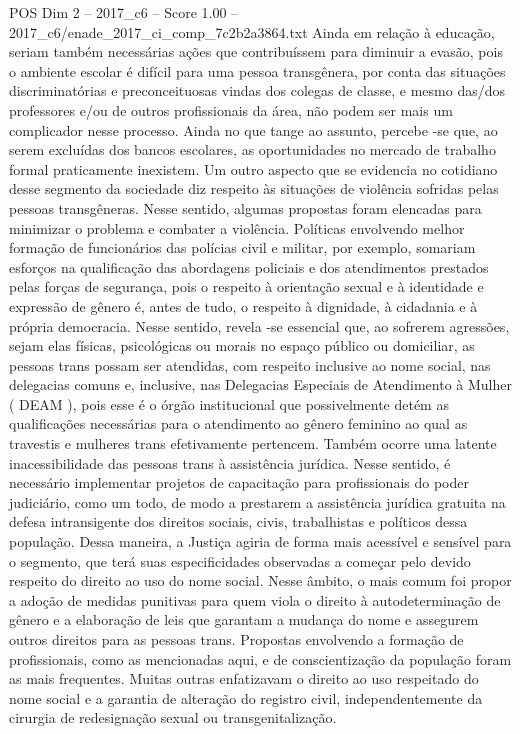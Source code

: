 \begin{textsample}{POS Dim 2 – 2017\_c6 – Score 1.00 – 2017\_c6/enade\_2017\_ci\_comp\_7c2b2a3864.txt}
Ainda em relação à educação, seriam também necessárias ações que contribuíssem para diminuir a evasão, pois o ambiente escolar é difícil para uma pessoa transgênera, por conta das situações discriminatórias e preconceituosas vindas dos colegas de classe, e mesmo das/dos professores e/ou de outros profissionais da área, não podem ser mais um complicador nesse processo.
Ainda no que tange ao assunto, percebe -se que, ao serem excluídas dos bancos escolares, as oportunidades no mercado de trabalho formal praticamente inexistem.
Um outro aspecto que se evidencia no cotidiano desse segmento da sociedade diz respeito às situações de violência sofridas pelas pessoas transgêneras.
Nesse sentido, algumas propostas foram elencadas para minimizar o problema e combater a violência.
Políticas envolvendo melhor formação de funcionários das polícias civil e militar, por exemplo, somariam esforços na qualificação das abordagens policiais e dos atendimentos prestados pelas forças de segurança, pois o respeito à orientação sexual e à identidade e expressão de gênero é, antes de tudo, o respeito à dignidade, à cidadania e à própria democracia.
Nesse sentido, revela -se essencial que, ao sofrerem agressões, sejam elas físicas, psicológicas ou morais no espaço público ou domiciliar, as pessoas trans possam ser atendidas, com respeito inclusive ao nome social, nas delegacias comuns e, inclusive, nas Delegacias Especiais de Atendimento à Mulher ( DEAM ), pois esse é o órgão institucional que possivelmente detém as qualificações necessárias para o atendimento ao gênero feminino ao qual as travestis e mulheres trans efetivamente pertencem.
Também ocorre uma latente inacessibilidade das pessoas trans à assistência jurídica.
Nesse sentido, é necessário implementar projetos de capacitação para profissionais do poder judiciário, como um todo, de modo a prestarem a assistência jurídica gratuita na defesa intransigente dos direitos sociais, civis, trabalhistas e políticos dessa população.
Dessa maneira, a Justiça agiria de forma mais acessível e sensível para o segmento, que terá suas especificidades observadas a começar pelo devido respeito do direito ao uso do nome social.
Nesse âmbito, o mais comum foi propor a adoção de medidas punitivas para quem viola o direito à autodeterminação de gênero e a elaboração de leis que garantam a mudança do nome e assegurem outros direitos para as pessoas trans.
Propostas envolvendo a formação de profissionais, como as mencionadas aqui, e de conscientização da população foram as mais frequentes.
Muitas outras enfatizavam o direito ao uso respeitado do nome social e a garantia de alteração do registro civil, independentemente da cirurgia de redesignação sexual ou transgenitalização.

\end{textsample}
